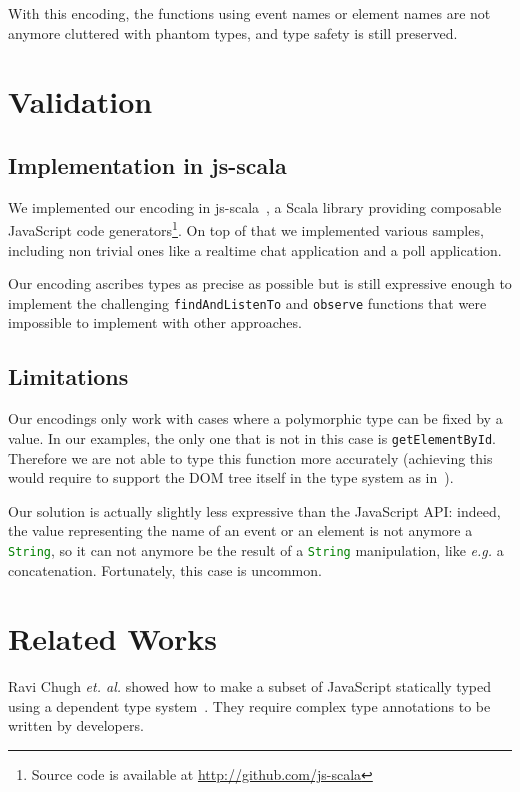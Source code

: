 \documentclass{llncs}
\newcommand{\jscode}[1]{\lstinline[language=JavaScript]|#1|}
\begin{document}
With this encoding, the functions using event names or element names are not anymore cluttered with phantom types, and type safety is still preserved.

\section{Validation}
\label{sec-validation}

\subsection{Implementation in js-scala}

We implemented our encoding in js-scala~\cite{Kossakowski12_JsDESL}, a Scala library providing composable JavaScript code generators\footnote{Source code is available at \href{http://github.com/js-scala}{http://github.com/js-scala}}. On top of that we implemented various samples, including non trivial ones like a realtime chat application and a poll application.

Our encoding ascribes types as precise as possible but is still expressive enough to implement the challenging \jscode{findAndListenTo} and \jscode{observe} functions that were impossible to implement with other approaches.

\subsection{Limitations}

Our encodings only work with cases where a polymorphic type can be fixed by a value. In our examples, the only one that is not in this case is \jscode{getElementById}. Therefore we are not able to type this function more accurately (achieving this would require to support the DOM tree itself in the type system as in~\cite{Lerner13_TypedJQuery}).

Our solution is actually slightly less expressive than the JavaScript API: indeed, the value representing the name of an event or an element is not anymore a \jscode{String}, so it can not anymore be the result of a \jscode{String} manipulation, like \emph{e.g.} a concatenation. Fortunately, this case is uncommon.

\section{Related Works}
\label{sec-related}

Ravi Chugh \emph{et. al.} showed how to make a subset of JavaScript statically typed using a dependent type system~\cite{Chugh12_DJS}. They require complex type annotations to be written by developers.
\end{document}
